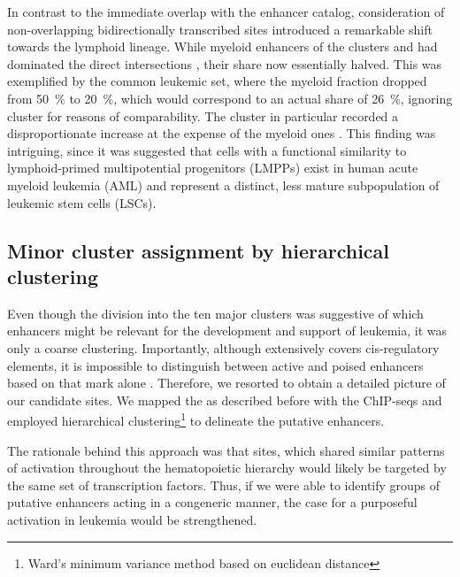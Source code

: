 In contrast to the immediate overlap with the enhancer catalog, consideration of non-overlapping bidirectionally transcribed sites introduced a remarkable shift towards the lymphoid lineage. While myeloid enhancers of the clusters \amittwo and \amitsix had dominated the direct intersections , their share now essentially halved. This was exemplified by the common leukemic set, where the myeloid fraction dropped from \SI{50}{\percent} to \SI{20}{\percent}, which
would correspond to an actual share of \SI{26}{\percent}, ignoring cluster  for reasons of comparability. The \amitthree cluster in particular recorded a disproportionate increase at the expense of the myeloid ones . This finding was intriguing, since it was suggested that cells with a functional similarity to lymphoid-primed multipotential progenitors (LMPPs) exist in human acute myeloid leukemia (AML) and represent a distinct, less mature subpopulation of leukemic stem cells (LSCs)\cite{Goardon2011}.
 
\FloatBarrier
\subsection{Minor cluster assignment by hierarchical clustering}
\label{chap:r:enhancers:cluster:minor}

Even though the division into the ten major clusters was suggestive of which enhancers might be relevant for the development and support of leukemia, it was only a coarse clustering. Importantly, although \hisfourone extensively covers cis-regulatory elements, it is impossible to distinguish between active and poised enhancers based on that mark alone \supple. Therefore, we resorted \histwentysevenac to obtain a detailed picture of our candidate sites. We mapped the \histwentysevenac as described before with the \hisfourone ChIP-seqs and employed hierarchical clustering\footnote{Ward's minimum variance method based on euclidean distance} to delineate the putative enhancers. 

The rationale behind this approach was that sites, which shared similar patterns of activation throughout the hematopoietic hierarchy would likely be targeted by the same set of transcription factors. Thus, if we were able to identify groups of putative enhancers acting in a congeneric manner, the case for a purposeful activation in \mllafnine leukemia would be strengthened.

